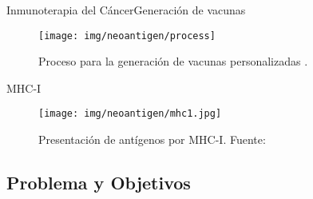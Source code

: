 \documentclass[10pt]{beamer}
\newcommand{\1}{
	\setbeamertemplate{background}{
		\texttt{[image: img/1]}
		\tikz[overlay] \fill[fill opacity=0.75,fill=white] (0,0) rectangle (-\paperwidth,\paperheight);
	}
}
\begin{document}
\begin{frame}{Inmunoterapia del Cáncer}{Generación de vacunas}	
	\begin{figure}
		\texttt{[image: img/neoantigen/process]}
		\caption{Proceso para la generación de vacunas personalizadas \cite{peng2019neoantigen}.}
	\end{figure}		
\end{frame}


\begin{frame}{MHC-I}{}		
	\begin{figure}[H]
		\centering
		\texttt{[image: img/neoantigen/mhc1.jpg]}
		\caption{Presentación de antígenos por MHC-I. Fuente: \cite{zhang2019application}}
		\label{fig:mhc1}
	\end{figure}	
\end{frame}



\subsection{Problema y Objetivos}
\end{document}
